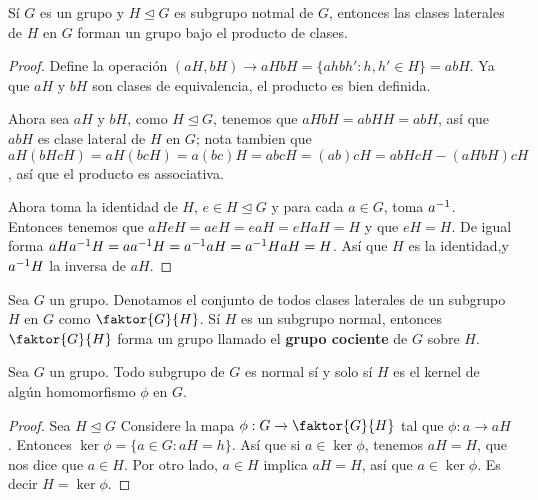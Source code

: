 \begin{theorem}\label{thm_4.9}
    S\'i $G$ es un grupo y  $H \unlhd G$ es subgrupo notmal de $G$, entonces las
    clases laterales de $H$ en  $G$ forman un grupo bajo el producto de clases.
\end{theorem}
\begin{proof}
    Define la operaci\'on $(aH,bH) \xrightarrow{} aHbH=\{ahbh' : h,h' \in
    H\}=abH$.  Ya que $aH$ y $bH$ son clases de equivalencia, el producto es
    bien definida.

    Ahora sea  $aH$ y  $bH$, como  $H \unlhd G$, tenemos que  $aHbH=abHH=abH$,
    as\'i que $abH$ es clase lateral de $H$ en  $G$; nota tambien que
    $aH(bHcH)=aH(bcH)=a(bc)H=abcH=(ab)cH=abHcH-(aHbH)cH$, as\'i que el producto
    es associativa.

    Ahora toma la identidad de $H$, $e \in H \unlhd G$ y para cada  $a \in G$,
    toma  $a^{-1}$. Entonces tenemos que $aHeH=aeH=eaH=eHaH=H$ y que  $eH=H$.
    De igual forma  $aHa^{-1}H=aa^{-1}H=a^{-1}aH=a^{-1}HaH=H$. As\'i que $H$
    es la identidad,y  $a^{-1}H$ la inversa de $aH$.
\end{proof}

\begin{definition}
    Sea $G$ un grupo. Denotamos el conjunto de todos clases laterales de un
    subgrupo $H$ en $G$ como $\faktor{G}{H}$. S\'i $H$ es un subgrupo normal,
    entonces  $\faktor{G}{H}$ forma un grupo llamado el \textbf{grupo cociente}
    de $G$ sobre $H$.
\end{definition}

\begin{lemma}\label{lemma_4.10}
    Sea $G$ un grupo. Todo subgrupo de  $G$ es normal s\'i y solo s\'i $H$ es el
    kernel de alg\'un homomorfismo  $\phi$ en  $G$.
\end{lemma}
\begin{proof}
    Sea $H \unlhd G$ Considere la mapa  $\phi:G \xrightarrow{} \faktor{G}{H}$
    tal que $\phi:a \xrightarrow{} aH$. Entonces $\ker{\phi}=\{a \in G :
    aH=h\}$. As\'i que si $a \in \ker{\phi}$, tenemos $aH=H$, que nos dice que
    $a \in H$. Por otro lado,  $a \in H$ implica  $aH=H$, as\'i que  $a \in
    \ker{\phi}$. Es decir $H=\ker{\phi}$.
\end{proof}


